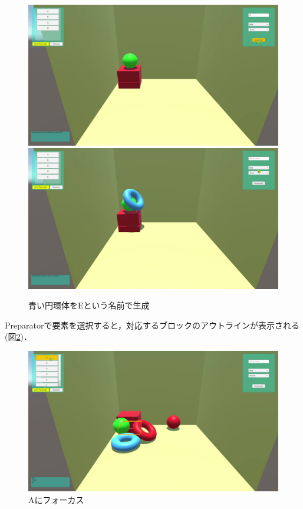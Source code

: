 \documentclass[12pt]{jarticle}
\begin{document}
\begin{figure}[!hbt]
  	\begin{center}
  		\includegraphics[scale=0.2]{images/BWP_Work6/bwp3.jpg}
  		\includegraphics[scale=0.2]{images/BWP_Work6/bwp4.jpg}
	\end{center}
  	\caption{青い円環体をEという名前で生成}
  	\label{fig:run2}
\end{figure}
\clearpage

Preparatorで要素を選択すると，対応するブロックのアウトラインが表示される(図\ref{fig:run3})．

\begin{figure}[!hbt]
  	\begin{center}
  		\includegraphics[scale=0.2]{images/BWP_Work6/bwp5.jpg}
	\end{center}
  	\caption{Aにフォーカス}
  	\label{fig:run3}
\end{figure}
\clearpage
\end{document}
